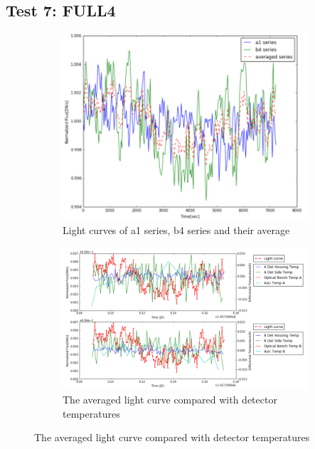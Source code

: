 \documentclass{aastex6}
\begin{document}
\subsection{Test 7: FULL4} 
\begin{figure}[H]
    \centering
    \begin{subfigure}{1}
        \includegraphics[scale=0.4]{ts_test7}
        \caption{Light curves of a1 series, b4 series and their average}
    \end{subfigure}

    \begin{subfigure}{2}
        \includegraphics[scale=0.4]{temp_test7}
        \caption{The averaged light curve compared with detector temperatures}
    \end{subfigure}
   

\end{figure}
\end{document}

